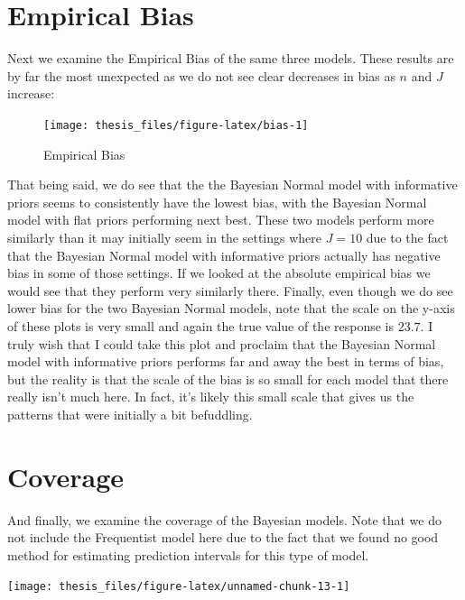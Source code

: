 \documentclass[12pt,twoside]{reedthesis}
\begin{document}
\hypertarget{empirical-bias}{%
\section{Empirical Bias}\label{empirical-bias}}

Next we examine the Empirical Bias of the same three models. These results are by far the most unexpected as we do not see clear decreases in bias as \(n\) and \(J\) increase:
\begin{figure}

{\centering \texttt{[image: thesis\_files/figure-latex/bias-1]} 

}

\caption{Empirical Bias}\label{fig:bias}
\end{figure}
That being said, we do see that the the Bayesian Normal model with informative priors seems to consistently have the lowest bias, with the Bayesian Normal model with flat priors performing next best. These two models perform more similarly than it may initially seem in the settings where \(J = 10\) due to the fact that the Bayesian Normal model with informative priors actually has negative bias in some of those settings. If we looked at the absolute empirical bias we would see that they perform very similarly there. Finally, even though we do see lower bias for the two Bayesian Normal models, note that the scale on the y-axis of these plots is very small and again the true value of the response is \(23.7\). I truly wish that I could take this plot and proclaim that the Bayesian Normal model with informative priors performs far and away the best in terms of bias, but the reality is that the scale of the bias is so small for each model that there really isn't much here. In fact, it's likely this small scale that gives us the patterns that were initially a bit befuddling.

\hypertarget{coverage}{%
\section{Coverage}\label{coverage}}

And finally, we examine the coverage of the Bayesian models. Note that we do not include the Frequentist model here due to the fact that we found no good method for estimating prediction intervals for this type of model.
\begin{center}\texttt{[image: thesis\_files/figure-latex/unnamed-chunk-13-1]} \end{center}
\end{document}
